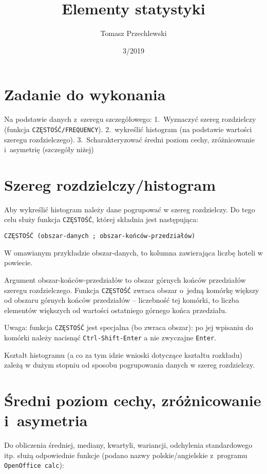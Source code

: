 \documentclass[a4page,11pt]{article}
\title{Elementy statystyki}
\author{Tomasz Przechlewski}
\date{3/2019}
\begin{document}
\maketitle

\section{Zadanie do wykonania}

Na podstawie danych z~szeregu szczegółowego: 1.~Wyznaczyć
szereg rozdzielczy (funkcja \texttt{CZĘSTOŚĆ/FREQUENCY}). 2.~wykreślić
histogram (na podstawie wartości szeregu rozdzielczego).
3.~Scharakteryzować średni poziom cechy, zróżnicowanie i~asymetrię
(szczegóły niżej)

\section{Szereg rozdzielczy/histogram}
Aby wykreślić histogram należy dane pogrupować w szereg
rozdzielczy. Do tego celu służy funkcja \texttt{CZĘSTOŚĆ}, której
składnia jest następująca:

\begin{verbatim}
CZĘSTOŚĆ (obszar-danych ; obszar-końców-przedziałów)
\end{verbatim}

W omawianym przykładzie obszar-danych, to kolumna zawierająca liczbę
hoteli w powiecie.

Argument obszar-końców-przedziałów to obszar górnych końców
przedziałów szeregu rozdzielczego. Funkcja \texttt{CZĘSTOŚĆ} zwraca
obszar o~jedną komórkę większy od obszaru górnych końców przedziałów
-- liczebność tej komórki, to liczba elementów większych od wartości
ostatniego górnego końca przedziału.


Uwaga: funkcja \texttt{CZĘSTOŚĆ} jest specjalna (bo zwraca obszar): po
jej wpisaniu do komórki należy nacisnąć \texttt{Ctrl-Shift-Enter} a
nie zwyczajne \texttt{Enter}.

Kształt histogramu (a co za tym idzie wnioski dotyczące kształtu
rozkładu) zależą w dużym stopniu od sposobu pogrupowania danych w
szereg rozdzielczy.

\section{Średni poziom cechy, zróżnicowanie i~asymetria}

Do obliczenia średniej, mediany, kwartyli, wariancji, odchylenia
standardowego itp. służą odpowiednie funkcje (podano
nazwy polskie/angielskie z~programu \texttt{OpenOffice~calc}):
\end{document}
